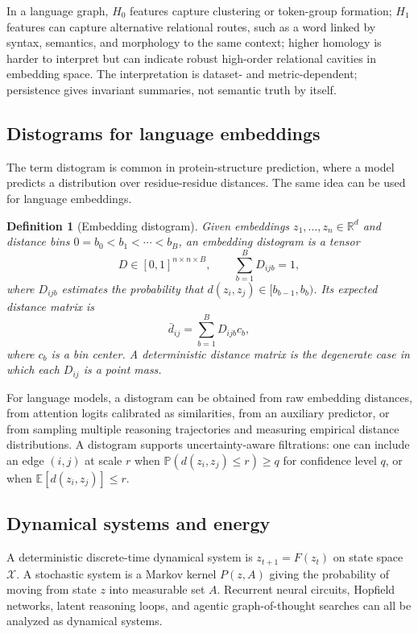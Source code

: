 \documentclass[11pt]{article}
\newtheorem{definition}{Definition}[section]
\newcommand{\R}{\mathbb{R}}
\newcommand{\E}{\mathbb{E}}
\newcommand{\calX}{\mathcal{X}}
\newcommand{\1}{\mathbf{1}}
\begin{document}
In a language graph, $H_0$ features capture clustering or token-group formation; $H_1$ features can capture alternative relational routes, such as a word linked by syntax, semantics, and morphology to the same context; higher homology is harder to interpret but can indicate robust high-order relational cavities in embedding space. The interpretation is dataset- and metric-dependent; persistence gives invariant summaries, not semantic truth by itself.

\subsection{Distograms for language embeddings}

The term distogram is common in protein-structure prediction, where a model predicts a distribution over residue-residue distances. The same idea can be used for language embeddings.

\begin{definition}[Embedding distogram]
Given embeddings $z_1,\ldots,z_n\in\R^d$ and distance bins $0=b_0<b_1<\cdots<b_B$, an embedding distogram is a tensor
\[
D\in[0,1]^{n\times n\times B},\qquad \sum_{b=1}^B D_{ijb}=1,
\]
where $D_{ijb}$ estimates the probability that $d(z_i,z_j)\in[b_{b-1},b_b)$. Its expected distance matrix is
\[
\bar d_{ij}=\sum_{b=1}^B D_{ijb} c_b,
\]
where $c_b$ is a bin center. A deterministic distance matrix is the degenerate case in which each $D_{ij}$ is a point mass.
\end{definition}

For language models, a distogram can be obtained from raw embedding distances, from attention logits calibrated as similarities, from an auxiliary predictor, or from sampling multiple reasoning trajectories and measuring empirical distance distributions. A distogram supports uncertainty-aware filtrations: one can include an edge $(i,j)$ at scale $r$ when $\mathbb{P}(d(z_i,z_j)\le r)\ge q$ for confidence level $q$, or when $\E[d(z_i,z_j)]\le r$.

\subsection{Dynamical systems and energy}

A deterministic discrete-time dynamical system is $z_{t+1}=F(z_t)$ on state space $\calX$. A stochastic system is a Markov kernel $P(z,A)$ giving the probability of moving from state $z$ into measurable set $A$. Recurrent neural circuits, Hopfield networks, latent reasoning loops, and agentic graph-of-thought searches can all be analyzed as dynamical systems.
\end{document}
